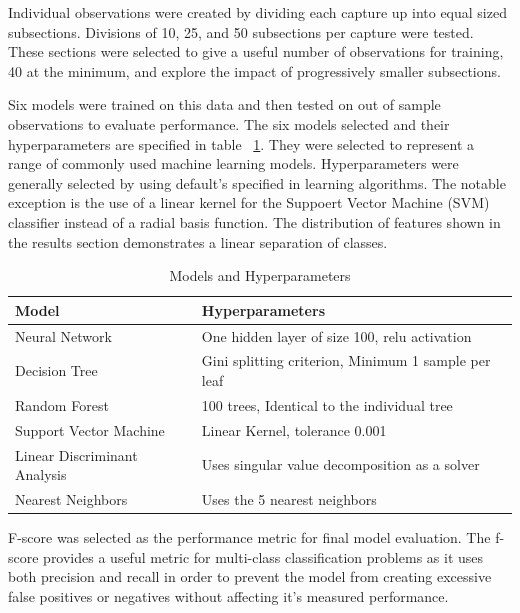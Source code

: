 \documentclass[12pt]{article}
\begin{document}
Individual observations were created by dividing each capture up into equal sized subsections. Divisions of 10, 25, and 50 subsections per capture were tested. These sections were selected to give a useful number of observations for training, 40 at the minimum, and explore the impact of progressively smaller subsections.

Six models were trained on this data and then tested on out of sample observations to evaluate performance. The six models selected and their hyperparameters are specified in table ~\ref{tab:hyperparameters}. They were selected to represent a range of commonly used machine learning models. Hyperparameters were generally selected by using default's specified in learning algorithms. The notable exception is the use of a linear kernel for the Suppoert Vector Machine (SVM) classifier instead of a radial basis function. The distribution of features shown in the results section demonstrates a linear separation of classes.

\begin{table}[H]
	\caption{Models and Hyperparameters}
	\label{tab:hyperparameters}
	\begin{tabular}{|l|l|}
		\hline
		Model                        & Hyperparameters                                     \\ \hline
		Neural Network               & One hidden layer of size 100, relu activation       \\ \hline
		Decision Tree                & Gini splitting criterion, Minimum 1 sample per leaf \\ \hline
		Random Forest                & 100 trees, Identical to the individual tree         \\ \hline
		Support Vector Machine       & Linear Kernel, tolerance 0.001                      \\ \hline
		Linear Discriminant Analysis & Uses singular value decomposition as a solver       \\ \hline
		Nearest Neighbors            & Uses the 5 nearest neighbors                        \\ \hline
	\end{tabular}
\end{table}

F-score was selected as the performance metric for final model evaluation. The f-score provides a useful metric for multi-class classification problems as it uses both precision and recall in order to prevent the model from creating excessive false positives or negatives without affecting it's measured performance.
\end{document}
